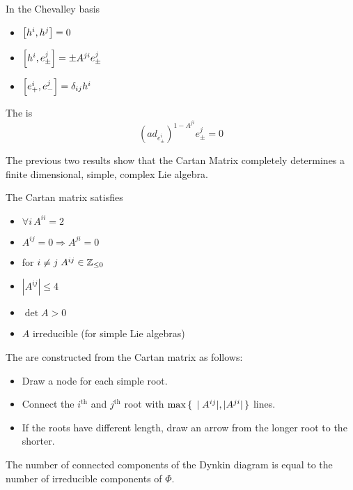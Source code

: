 \documentclass{article}
\begin{document}
\begin{theorem}
	In the Chevalley basis
	\begin{itemize}
		\item $\comm[h^i]{h^j}=0$
		\item $\comm[h^i]{e^j_\pm}=\pm A^{ji} e^j_\pm$
		\item $\comm[e^i_+]{e^j_-}=\delta_{ij} h^i$
	\end{itemize}
\end{theorem}

\begin{theorem}
	The  is 
	\[
	\left( ad_{e^i_\pm}\right)^{1-A^{ji}} e^j_\pm=0
	\]
\end{theorem}

\begin{idea}
	The previous two results show that the Cartan Matrix completely determines a finite dimensional, simple, complex Lie algebra. 
\end{idea}

\begin{theorem}
	The Cartan matrix satisfies
	\begin{itemize}
		\item $\forall i \, A^{ii}=2$
		\item $A^{ij}=0 \Rightarrow A^{ji}=0$
		\item for $i \neq j \; A^{ij}\in\mbb{Z}_{\leq0}$
		\item $|A^{ij}|\leq4$
		\item $\det{A}>0$
		\item $A$ irreducible (for simple Lie algebras)
	\end{itemize}
\end{theorem}

\begin{definition}
	The  are constructed from the Cartan matrix as follows:
	\begin{itemize}
		\item Draw a node for each simple root.
		\item Connect the $i^{\text{th}}$ and $j^\text{th}$ root with $\max\set{  |A^{ij}|, |A^{ji}|  }$ lines. 
		\item If the roots have different length, draw an arrow from the longer root to the shorter. 
	\end{itemize}
\end{definition}

\begin{prop}
	The number of connected components of the Dynkin diagram is equal to the number of irreducible components of $\Phi$. 
\end{prop}
\end{document}
